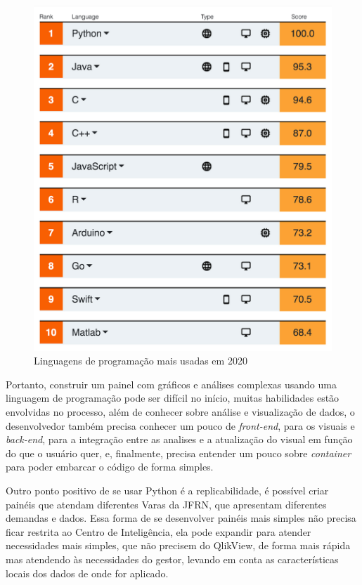 \begin{figure}[h]
	\centering
	\includegraphics[scale=0.25]{./figures/cap2/ranking_python.jpeg}
	\caption{Linguagens de programação mais usadas em 2020}
\end{figure}

Portanto, construir um painel com gráficos e análises complexas usando uma linguagem de programação pode ser difícil no início, muitas habilidades estão envolvidas no processo, além de conhecer sobre análise e visualização de dados, o desenvolvedor também precisa conhecer um pouco de \textit{front-end}, para os visuais e \textit{back-end}, para a integração entre as analises e a atualização do visual em função do que o usuário quer, e, finalmente, precisa entender um pouco sobre \textit{container} para poder embarcar o código de forma simples. 

Outro ponto positivo de se usar Python é a replicabilidade, é possível criar painéis que atendam diferentes Varas da JFRN, que apresentam diferentes demandas e dados. Essa forma de se desenvolver painéis mais simples não precisa ficar restrita ao Centro de Inteligência, ela pode expandir para atender necessidades mais simples, que não precisem do QlikView, de forma mais rápida mas atendendo às necessidades do gestor, levando em conta as características locais dos dados de onde for aplicado. 

